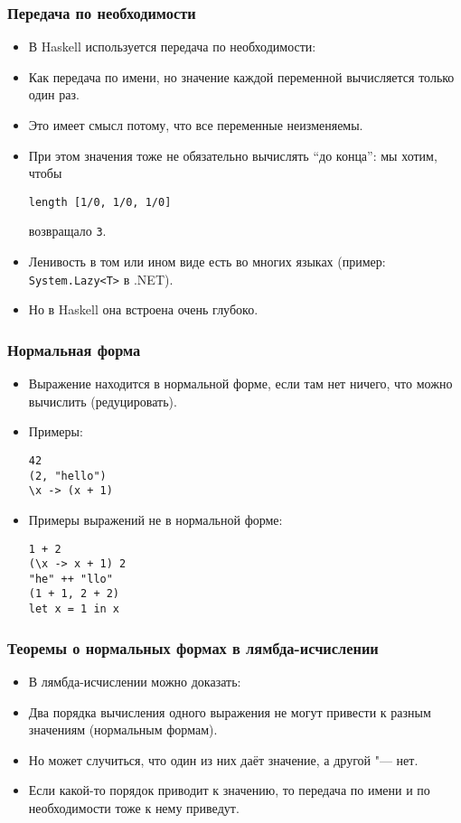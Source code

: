 \documentclass[11pt]{beamer}
\begin{document}
\begin{frame}[fragile]
  \frametitle{Передача по необходимости}
  \begin{itemize}
    \item В Haskell используется передача по необходимости:
    \item Как передача по имени, но значение каждой переменной вычисляется только один раз.
          \pause
    \item Это имеет смысл потому, что все переменные неизменяемы.
          \pause
    \item При этом значения тоже не обязательно вычислять \enquote{до конца}: мы хотим, чтобы
          \begin{lstlisting}
length [1/0, 1/0, 1/0]
\end{lstlisting}
          возвращало \lstinline|3|.
          \pause
    \item Ленивость в том или ином виде есть во многих языках (пример: \lstinline|System.Lazy<T>| в .NET).
    \item Но в Haskell она встроена очень глубоко.
  \end{itemize}
\end{frame}

\begin{frame}[fragile]
  \frametitle{Нормальная форма}
  \begin{itemize}
    \item Выражение находится в нормальной форме, если там нет ничего, что можно вычислить (редуцировать).
    \item Примеры: \pause
          \begin{lstlisting}
42
(2, "hello")
\x -> (x + 1)
\end{lstlisting}
    \item Примеры выражений не в нормальной форме: \pause
          \begin{lstlisting}
1 + 2                 
(\x -> x + 1) 2       
"he" ++ "llo"         
(1 + 1, 2 + 2)
let x = 1 in x
\end{lstlisting}
  \end{itemize}
\end{frame}

\begin{frame}[fragile]
  \frametitle{Теоремы о нормальных формах в лямбда-исчислении}
  \begin{itemize}
    \item В лямбда-исчислении можно доказать:
    \item Два порядка вычисления одного выражения не могут привести к разным значениям (нормальным формам).
    \item Но может случиться, что один из них даёт значение, а другой "--- нет.
    \item Если какой-то порядок приводит к значению, то передача по имени и по необходимости тоже к нему приведут.
  \end{itemize}
\end{frame}
\end{document}
